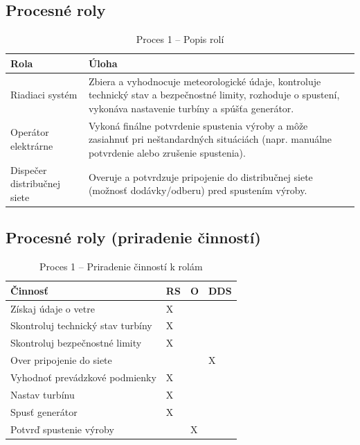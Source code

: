 \documentclass[12pt,a4paper]{article}
\begin{document}
\subsection{Procesné roly}
\begin{table}[H]
  \centering
  \renewcommand{\arraystretch}{1.2}
  \begin{tabularx}{\textwidth}{|p{}|X|}
    \hline
    \textbf{Rola} & \textbf{Úloha} \\
    \hline
    Riadiaci systém & Zbiera a vyhodnocuje meteorologické údaje, kontroluje technický stav a bezpečnostné limity, rozhoduje o spustení, vykonáva nastavenie turbíny a spúšťa generátor. \\
    \hline
    Operátor elektrárne & Vykoná finálne potvrdenie spustenia výroby a môže zasiahnuť pri neštandardných situáciách (napr. manuálne potvrdenie alebo zrušenie spustenia). \\
    \hline
    Dispečer distribučnej siete & Overuje a potvrdzuje pripojenie do distribučnej siete (možnosť dodávky/odberu) pred spustením výroby. \\
    \hline
  \end{tabularx}
  \caption{Proces 1 -- Popis rolí}
\end{table}

\subsection{Procesné roly (priradenie činností)}
\begin{table}[H]
  \centering
  \small
  \renewcommand{\arraystretch}{1.2}
  \begin{tabularx}{\textwidth}{|X|p{}|p{}|p{}|}
    \hline
    \textbf{Činnosť} & \textbf{RS} & \textbf{O} & \textbf{DDS} \\
    \hline
    Získaj údaje o vetre & X &  &  \\
    \hline
    Skontroluj technický stav turbíny & X &  &  \\
    \hline
    Skontroluj bezpečnostné limity & X &  &  \\
    \hline
    Over pripojenie do siete &  &  & X \\
    \hline
    Vyhodnoť prevádzkové podmienky & X &  &  \\
    \hline
    Nastav turbínu & X &  &  \\
    \hline
    Spusť generátor & X &  &  \\
    \hline
    Potvrď spustenie výroby &  & X &  \\
    \hline
  \end{tabularx}
  \caption{Proces 1 -- Priradenie činností k rolám}
\end{table}
\end{document}
